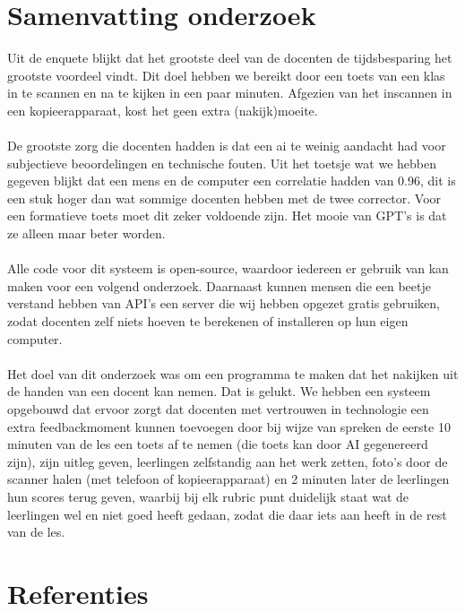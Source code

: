 \documentclass[12pt]{article}
\begin{document}
\section{Samenvatting onderzoek}
\begin{multicols}{2}
Uit de enquete blijkt dat het grootste deel van de docenten de tijdsbesparing het grootste voordeel vindt. Dit doel hebben we bereikt door een toets van een klas in te scannen en na te kijken in een paar minuten. Afgezien van het inscannen in een kopieerapparaat, kost het geen extra (nakijk)moeite.\\
\\
De grootste zorg die docenten hadden is dat een ai te weinig aandacht had voor subjectieve beoordelingen en technische fouten. Uit het toetsje wat we hebben gegeven blijkt dat een mens en de computer een correlatie hadden van 0.96, dit is een stuk hoger dan wat sommige docenten hebben met de twee corrector. Voor een formatieve toets moet dit zeker voldoende zijn. Het mooie van GPT's is dat ze alleen maar beter worden.\\
\\
Alle code voor dit systeem is open-source, waardoor iedereen er gebruik van kan maken voor een volgend onderzoek. Daarnaast kunnen mensen die een beetje verstand hebben van API's een server die wij hebben opgezet gratis gebruiken, zodat docenten zelf niets hoeven te berekenen of installeren op hun eigen computer.\\
\\
Het doel van dit onderzoek was om een programma te maken dat het nakijken uit de handen van een docent kan nemen. Dat is gelukt. We hebben een systeem opgebouwd dat ervoor zorgt dat docenten met vertrouwen in technologie een extra feedbackmoment kunnen toevoegen door bij wijze van spreken de eerste 10 minuten van de les een toets af te nemen (die toets kan door AI gegenereerd zijn), zijn uitleg geven, leerlingen zelfstandig aan het werk zetten, foto's door de scanner halen (met telefoon of kopieerapparaat) en 2 minuten later de leerlingen hun scores terug geven, waarbij bij elk rubric punt duidelijk staat wat de leerlingen wel en niet goed heeft gedaan, zodat die daar iets aan heeft in de rest van de les. \\ 
\end{multicols}
\pagebreak
\section{Referenties}

\printbibliography[heading=none]
\end{document}
